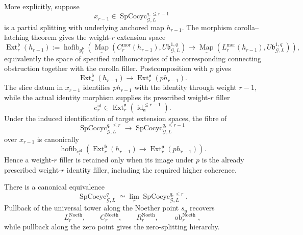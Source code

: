 \begin{construction}
More explicitly, suppose
\[
x_{r-1}\in
\operatorname{SpCocyc}_{\mathcal G,L}^{q,\le r-1}
\]
is a partial splitting with underlying anchored map $h_{r-1}$.  The morphism
corolla--latching theorem gives the weight-$r$ extension space
\[
\operatorname{Ext}^{\mathfrak b}_r(h_{r-1})
:=
\operatorname{hofib}_{g_r^{\mathfrak b}}
\left(
\underline{\operatorname{Map}}
(C_r^{\mathrm{mor}}(h_{r-1}),U\mathfrak b_{\mathcal G,L}^{1,q})
\longrightarrow
\underline{\operatorname{Map}}
(L_r^{\mathrm{mor}}(h_{r-1}),U\mathfrak b_{\mathcal G,L}^{1,q})
\right),
\]
equivalently the space of specified nullhomotopies of the corresponding
connecting obstruction together with the corolla filler.  Postcomposition with
$p$ gives
\[
\operatorname{Ext}^{\mathfrak b}_r(h_{r-1})
\longrightarrow
\operatorname{Ext}^{\mathfrak a}_r(ph_{r-1}).
\]
The slice datum in $x_{r-1}$ identifies $ph_{r-1}$ with the identity through
weight $r-1$, while the actual identity morphism supplies its prescribed
weight-$r$ filler
\[
e_r^{\operatorname{id}}
\in
\operatorname{Ext}^{\mathfrak a}_r(\operatorname{id}_{\mathfrak a}^{\le r-1}).
\]
Under the induced identification of target extension spaces, the fibre of
\[
\operatorname{SpCocyc}_{\mathcal G,L}^{q,\le r}
\longrightarrow
\operatorname{SpCocyc}_{\mathcal G,L}^{q,\le r-1}
\]
over $x_{r-1}$ is canonically
\[
\boxed{
\operatorname{hofib}_{e_r^{\operatorname{id}}}
\left(
\operatorname{Ext}^{\mathfrak b}_r(h_{r-1})
\longrightarrow
\operatorname{Ext}^{\mathfrak a}_r(ph_{r-1})
\right).
}
\]
Hence a weight-$r$ filler is retained only when its image under $p$ is the
already prescribed weight-$r$ identity filler, including the required higher
coherence.
\end{construction}

\begin{theorem}
\label{thm:symmetry-noether-finite-weight-reconstruction-of-integral-noether-spencer-cocycles}
There is a canonical equivalence
\[
\boxed{
\operatorname{SpCocyc}_{\mathcal G,L}^{q}
\simeq
\lim_r
\operatorname{SpCocyc}_{\mathcal G,L}^{q,\le r}.
}
\]
Pullback of the universal tower along the Noether point $s_{\mathfrak n}$ recovers
\[
L_r^{\mathrm{Noeth}},\qquad
C_r^{\mathrm{Noeth}},\qquad
R_r^{\mathrm{Noeth}},\qquad
\operatorname{ob}^{\mathrm{Noeth}}_r,
\]
while pullback along the zero point gives the zero-splitting hierarchy.
\end{theorem}

